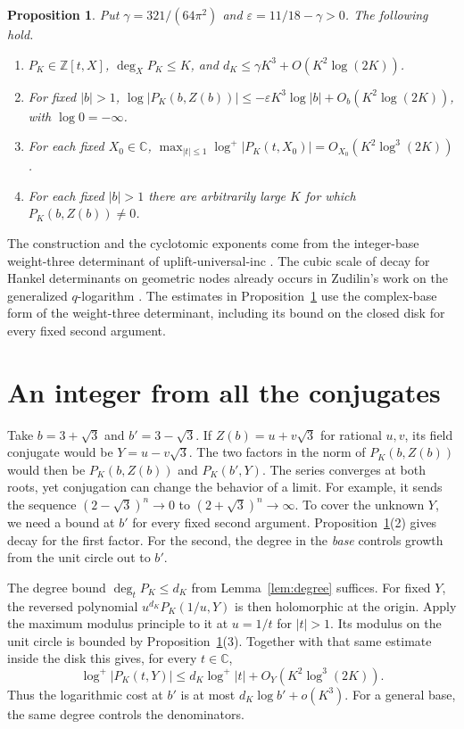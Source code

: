 \documentclass[11pt,letterpaper]{article}
\newtheorem{proposition}[theorem]{Proposition}
\numberwithin{equation}{section}
\newcommand{\Z}{\mathbb Z}
\newcommand{\C}{\mathbb C}
\newcommand{\lp}{\log^{+}}
\begin{document}
\begin{proposition}\label{prop:inputs}
Put \(\gamma=321/(64\pi^2)\) and \(\varepsilon=11/18-\gamma>0\).
The following hold.
\begin{enumerate}
\item \(P_K\in\Z[t,X]\), \(\deg_XP_K\le K\), and
      \(d_K\le\gamma K^3+O(K^2\log(2K))\).
\item For fixed \(|b|>1\),
      \(\log|P_K(b,Z(b))|\le-\varepsilon K^3\log|b|+
        O_b(K^2\log(2K))\), with \(\log 0=-\infty\).
\item For each fixed \(X_0\in\C\),
      \(\max_{|t|\le1}\lp|P_K(t,X_0)|=O_{X_0}(K^2\log^3(2K))\).
\item For each fixed \(|b|>1\) there are arbitrarily large \(K\)
      for which \(P_K(b,Z(b))\ne0\).
\end{enumerate}
\end{proposition}

The construction and the cyclotomic exponents come from the
integer-base weight-three determinant of uplift-universal-inc
\cite[\S\S1--5 and Appendix~A]{Uplift}. The cubic scale of decay for
Hankel determinants on geometric nodes already occurs in Zudilin's
work on the generalized \(q\)-logarithm \cite[\S4, (8)]{Zudilin}.
The estimates in Proposition~\ref{prop:inputs} use the complex-base
form of the weight-three determinant, including its bound on the
closed disk for every fixed second argument.

\section{An integer from all the conjugates}\label{sec:places}

Take \(b=3+\sqrt3\) and \(b'=3-\sqrt3\). If \(Z(b)=u+v\sqrt3\)
for rational \(u,v\), its field conjugate would be \(Y=u-v\sqrt3\).
The two factors in the norm of \(P_K(b,Z(b))\) would then be
\(P_K(b,Z(b))\) and \(P_K(b',Y)\). The series converges at both roots,
yet conjugation can change the behavior of a limit. For example, it
sends the sequence \((2-\sqrt3)^n\to0\) to \((2+\sqrt3)^n\to\infty\).
To cover the unknown \(Y\), we need a bound at \(b'\) for every fixed
second argument.
Proposition~\ref{prop:inputs}(2) gives decay for the first factor.
For the second, the degree in the \emph{base} controls growth from
the unit circle out to \(b'\).

The degree bound \(\deg_tP_K\le d_K\) from Lemma~\ref{lem:degree}
suffices. For fixed \(Y\), the reversed polynomial
\(u^{d_K}P_K(1/u,Y)\) is then
holomorphic at the origin. Apply the maximum modulus principle to it
at \(u=1/t\) for \(|t|>1\). Its modulus on the unit circle is bounded
by Proposition~\ref{prop:inputs}(3). Together with that same estimate
inside the disk this gives, for every \(t\in\C\),
\begin{equation}\label{eq:arch}
 \lp|P_K(t,Y)|\le d_K\lp |t|+O_Y(K^2\log^3(2K)).
\end{equation}
Thus the logarithmic cost at \(b'\) is at most \(d_K\log b'+o(K^3)\).
For a general base, the same degree controls the denominators.
\end{document}
